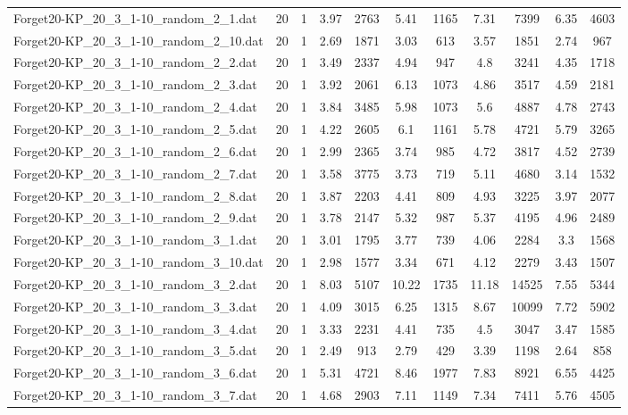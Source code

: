 \begin{table}[!ht]
\begin{tabular}{lcccccccccc}
Forget20-KP\_20\_3\_1-10\_random\_2\_1.dat & 20 & 1 & 3.97 & 2763 & 5.41 & 1165 & 7.31 & 7399 & 6.35 & 4603 \\
Forget20-KP\_20\_3\_1-10\_random\_2\_10.dat & 20 & 1 & 2.69 & 1871 & 3.03 & 613 & 3.57 & 1851 & 2.74 & 967 \\
Forget20-KP\_20\_3\_1-10\_random\_2\_2.dat & 20 & 1 & 3.49 & 2337 & 4.94 & 947 & 4.8 & 3241 & 4.35 & 1718 \\
Forget20-KP\_20\_3\_1-10\_random\_2\_3.dat & 20 & 1 & 3.92 & 2061 & 6.13 & 1073 & 4.86 & 3517 & 4.59 & 2181 \\
Forget20-KP\_20\_3\_1-10\_random\_2\_4.dat & 20 & 1 & 3.84 & 3485 & 5.98 & 1073 & 5.6 & 4887 & 4.78 & 2743 \\
Forget20-KP\_20\_3\_1-10\_random\_2\_5.dat & 20 & 1 & 4.22 & 2605 & 6.1 & 1161 & 5.78 & 4721 & 5.79 & 3265 \\
Forget20-KP\_20\_3\_1-10\_random\_2\_6.dat & 20 & 1 & 2.99 & 2365 & 3.74 & 985 & 4.72 & 3817 & 4.52 & 2739 \\
Forget20-KP\_20\_3\_1-10\_random\_2\_7.dat & 20 & 1 & 3.58 & 3775 & 3.73 & 719 & 5.11 & 4680 & 3.14 & 1532 \\
Forget20-KP\_20\_3\_1-10\_random\_2\_8.dat & 20 & 1 & 3.87 & 2203 & 4.41 & 809 & 4.93 & 3225 & 3.97 & 2077 \\
Forget20-KP\_20\_3\_1-10\_random\_2\_9.dat & 20 & 1 & 3.78 & 2147 & 5.32 & 987 & 5.37 & 4195 & 4.96 & 2489 \\
Forget20-KP\_20\_3\_1-10\_random\_3\_1.dat & 20 & 1 & 3.01 & 1795 & 3.77 & 739 & 4.06 & 2284 & 3.3 & 1568 \\
Forget20-KP\_20\_3\_1-10\_random\_3\_10.dat & 20 & 1 & 2.98 & 1577 & 3.34 & 671 & 4.12 & 2279 & 3.43 & 1507 \\
Forget20-KP\_20\_3\_1-10\_random\_3\_2.dat & 20 & 1 & 8.03 & 5107 & 10.22 & 1735 & 11.18 & 14525 & 7.55 & 5344 \\
Forget20-KP\_20\_3\_1-10\_random\_3\_3.dat & 20 & 1 & 4.09 & 3015 & 6.25 & 1315 & 8.67 & 10099 & 7.72 & 5902 \\
Forget20-KP\_20\_3\_1-10\_random\_3\_4.dat & 20 & 1 & 3.33 & 2231 & 4.41 & 735 & 4.5 & 3047 & 3.47 & 1585 \\
Forget20-KP\_20\_3\_1-10\_random\_3\_5.dat & 20 & 1 & 2.49 & 913 & 2.79 & 429 & 3.39 & 1198 & 2.64 & 858 \\
Forget20-KP\_20\_3\_1-10\_random\_3\_6.dat & 20 & 1 & 5.31 & 4721 & 8.46 & 1977 & 7.83 & 8921 & 6.55 & 4425 \\
Forget20-KP\_20\_3\_1-10\_random\_3\_7.dat & 20 & 1 & 4.68 & 2903 & 7.11 & 1149 & 7.34 & 7411 & 5.76 & 4505 \\

\end{tabular}
\end{table}
